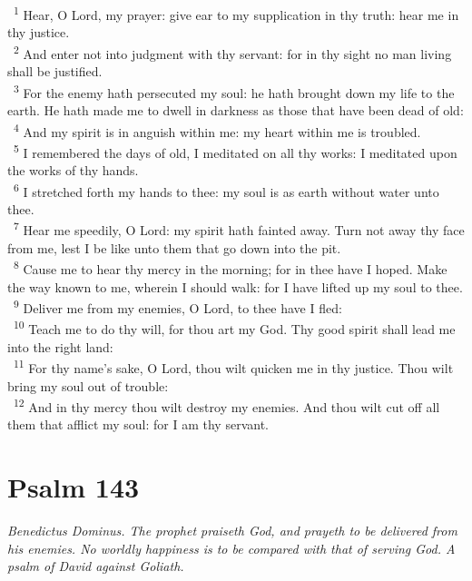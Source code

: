\documentclass[a5paper,12pt]{article}
\begin{document}
\begin{multicols*}{2}
~\textsuperscript{1} Hear, O Lord, my prayer: give ear to my supplication in thy truth: hear me in thy justice.\\
~\textsuperscript{2} And enter not into judgment with thy servant: for in thy sight no man living shall be justified.\\
~\textsuperscript{3} For the enemy hath persecuted my soul: he hath brought down my life to the earth. He hath made me to dwell in darkness as those that have been dead of old:\\
~\textsuperscript{4} And my spirit is in anguish within me: my heart within me is troubled.\\
~\textsuperscript{5} I remembered the days of old, I meditated on all thy works: I meditated upon the works of thy hands.\\
~\textsuperscript{6} I stretched forth my hands to thee: my soul is as earth without water unto thee.\\
~\textsuperscript{7} Hear me speedily, O Lord: my spirit hath fainted away. Turn not away thy face from me, lest I be like unto them that go down into the pit.\\
~\textsuperscript{8} Cause me to hear thy mercy in the morning; for in thee have I hoped. Make the way known to me, wherein I should walk: for I have lifted up my soul to thee.\\
~\textsuperscript{9} Deliver me from my enemies, O Lord, to thee have I fled:\\
~\textsuperscript{10} Teach me to do thy will, for thou art my God. Thy good spirit shall lead me into the right land:\\
~\textsuperscript{11} For thy name's sake, O Lord, thou wilt quicken me in thy justice. Thou wilt bring my soul out of trouble:\\
~\textsuperscript{12} And in thy mercy thou wilt destroy my enemies. And thou wilt cut off all them that afflict my soul: for I am thy servant.\\

\section{Psalm 143}
\label{sec:org9a71aeb}
\emph{Benedictus Dominus. The prophet praiseth God, and prayeth to be delivered from his enemies. No worldly happiness is to be compared with that of serving God. A psalm of David against Goliath.}\\


\end{multicols*}
\end{document}

